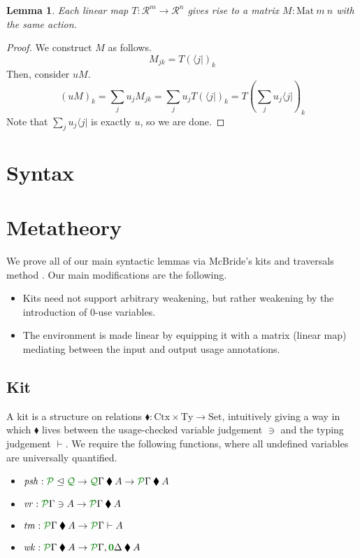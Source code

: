 \documentclass[submission,copyright,creativecommons]{eptcs}
\newtheorem{lemma}[theorem]{Lemma}
\newcommand{\kitrel}{\mathbin{\blacklozenge}}
\begin{document}
\begin{lemma}
  Each linear map $T : \mathscr R^m \to \mathscr R^n$ gives rise to a matrix
  $M : \mathrm{Mat}~m~n$ with the same action.
\end{lemma}
\begin{proof}
  We construct $M$ as follows.
  \[
    M_{jk} = T(\langle j \rvert)_k
  \]
  Then, consider $uM$.
  \[
    (uM)_k = \sum_j u_jM_{jk} = \sum_j u_jT\left(\langle j \rvert\right)_k
    = T\left(\sum_j u_j\langle j \rvert\right)_k
  \]
  Note that $\sum_j u_j\langle j \rvert$ is exactly $u$, so we are done.
\end{proof}

\section{Syntax}

\section{Metatheory}

We prove all of our main syntactic lemmas via McBride's kits and traversals
method \cite{rensub05}.
Our main modifications are the following.
\begin{itemize}
  \item Kits need not support arbitrary weakening, but rather weakening by the
    introduction of $0$-use variables.
  \item The environment is made linear by equipping it with a matrix (linear map)
    mediating between the input and output usage annotations.
\end{itemize}

\subsection{Kit}

A kit is a structure on relations
$\kitrel : \mathrm{Ctx} \times \mathrm{Ty} \to \mathrm{Set}$, intuitively
giving a way in which $\kitrel$ lives between the usage-checked variable
judgement $\ni$ and the typing judgement $\vdash$.
We require the following functions, where all undefined variables are
universally quantified.

\begin{itemize}
  \item
    $\mathit{psh} : \resctx P \subres \resctx Q \to
    \ctx{\Gamma}{Q} \kitrel A \to \ctx{\Gamma}{P} \kitrel A$
  \item $\mathit{vr} : \ctx{\Gamma}{P} \ni A \to
    \ctx{\Gamma}{P} \kitrel A$
  \item $\mathit{tm} : \ctx{\Gamma}{P} \kitrel A \to
    \ctx{\Gamma}{P} \vdash A$
  \item $\mathit{wk} : \ctx{\Gamma}{P} \kitrel A \to
    \ctx{\Gamma}{P}, \ctx{\Delta}{\vct 0} \kitrel A$
\end{itemize}
\end{document}
